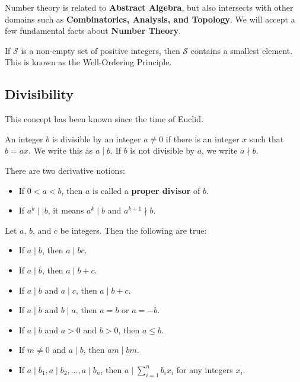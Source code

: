 \documentclass[11pt]{article}
\begin{document}
Number theory is related to \textbf{Abstract Algebra}, but also intersects with
other domains such as \textbf{Combinatorics, Analysis, and Topology}. We will
accept a few fundamental facts about \textbf{Number Theory}.

\begin{fact}
    If \(\mathcal{S}\) is a non-empty set of positive integers, then \(\mathcal{S}\) contains a smallest element. This is known as the Well-Ordering Principle.
\end{fact}

\subsection{Divisibility}
This concept has been known since the time of Euclid.

\begin{definition}
    An integer $b$ is divisible by an integer $a \neq 0$ if there is an integer $x$ such that $b = ax$. We write this as $a \mid b$. If $b$ is not divisible by $a$, we write $a \nmid b$.
\end{definition}

There are two derivative notions:
\begin{itemize}
    \item If $0 < a < b$, then $a$ is called a \textbf{proper divisor} of $b$.
    \item If $a^k \mid\mid b$, it means $a^k \mid b$ and $a^{k + 1} \nmid b$.
\end{itemize}

\begin{theorem}
    Let $a$, $b$, and $c$ be integers. Then the following are true:
    \begin{itemize}
        \item If $a \mid b$, then $a \mid bc$.
        \item If $a \mid b$, then $a \mid b + c$.
        \item If $a \mid b$ and $a \mid c$, then $a \mid b + c$.
        \item If $a \mid b$ and $b \mid a$, then $a = b$ or $a = -b$.
        \item If $a \mid b$ and $a > 0$ and $b > 0$, then $a \leq b$.
        \item If $m \neq 0$ and $a \mid b$, then $am \mid bm$.
        \item If $a \mid b_1, a \mid b_2, \ldots, a \mid b_n$, then $a \mid \sum_{i=1}^{n}
                  b_i x_i$ for any integers $x_i$.
    \end{itemize}
\end{theorem}
\end{document}
